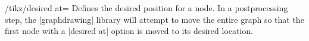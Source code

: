 \begin{key}{/tikz/desired at=}
  Defines the desired position for a node. In a postprocessing step, the
  |graphdrawing| library will attempt to move the entire graph so that
  the first node with a |desired at| option is moved to its desired 
  location.
  \begin{codeexample}[]
  \end{codeexample}
\end{key}

%
%
%
%  
%
%
%

